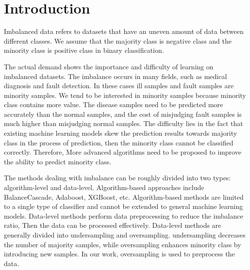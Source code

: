\documentclass[runningheads]{llncs}
\begin{document}
\section{Introduction}
Imbalanced data\cite{2004Editorial} refers to datasets that have an uneven 
amount of data between different classes. 
We assume that the majority class is negative class and 
the minority class is positive class in binary classification.

The actual demand shows the importance and difficulty of learning on imbalanced datasets.
The imbalance occurs in many fields, such as medical 
diagnosis\cite{2013Computational,2019Electrocardiogram} and fault detection\cite{2018Imbalanced}.
In these cases ill samples and fault samples are minority samples.
We tend to be interested in minority samples because minority class contains more value. 
The disease samples need to be predicted more accurately than the normal samples, 
and the cost of misjudging fault samples is much higher than misjudging normal samples.
The difficulty %
lies in the fact that existing machine 
learning models skew the prediction results towards 
majority class in the process of prediction\cite{Victoria2013An}, then 
the minority class cannot be classified correctly\cite{2016A}. 
Therefore, More advanced algorithms need to 
be proposed to improve the ability to predict minority class.

The methods dealing with imbalance can be roughly
divided into two types: algorithm-level\cite{2007Highcost-sensitive} and data-level\cite{2002SMOTE}.
Algorithm-based approaches include BalanceCascade\cite{2019Class}, Adaboost, 
XGBoost\cite{Chen_2016}, etc. 
Algorithm-based methods are limited 
to a single type of classifier\cite{2020Combined} and 
cannot be extended to general machine learning models.
Data-level methods perform data preprocessing to reduce the imbalance ratio, Then 
the data can be processed effectively.
Data-level methods are generally divided into undersampling\cite{2015Undersampled} 
and oversampling\cite{2002SMOTE}. 
undersampling decreases the number of majority samples, %
while oversampling enhances minority class by introducing new samples\cite{2010A}.
In our work, oversampling is used to preprocess the data.
\end{document}
